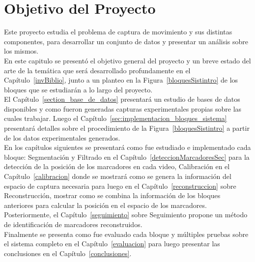 \section{Objetivo del Proyecto}

Este proyecto estudia el problema de captura de movimiento y sus distintas componentes, para desarrollar un conjunto de datos y presentar un análisis sobre los mismos. 
\\

En este capitulo se presentó el objetivo general del proyecto y un breve estado del arte de la temática que será desarrollado profundamente en el Capítulo~\ref{invBiblio}, junto a un planteo en la Figura~\ref{bloquesSistintro} de los bloques que se estudiarán a lo largo del proyecto. 
\\

El Capítulo~\ref{section_base_de_datos} presentará un estudio de bases de datos disponibles y como fueron generadas capturas experimentales propias sobre las cuales trabajar. Luego el Capítulo~\ref{sec:implementacion_bloques_sistema} presentará detalles sobre el procedimiento de la Figura~\ref{bloquesSistintro} a partir de los datos experimentales generados. 
\\

En los capítulos siguientes se presentará como fue estudiado e implementado cada bloque: Segmentación y Filtrado en el Capítulo~\ref{deteccionMarcadoresSec} para la detección de la posición de los marcadores en cada video, Calibración en el Capítulo~\ref{calibracion} donde se mostrará como se genera la información del espacio de captura necesaria para luego en el Capítulo~\ref{reconstruccion} sobre Reconstrucción, mostrar como se combina la información de los bloques anteriores para calcular la posición en el espacio de los marcadores. 
\\

Posteriormente, el Capítulo~\ref{seguimiento} sobre Seguimiento propone un método de identificación de marcadores reconstruidos. 
\\

Finalmente se presenta como fue evaluado cada bloque y múltiples pruebas sobre el sistema completo en el Capítulo~\ref{evaluacion} para luego presentar las conclusiones en el Capítulo~\ref{conclusiones}.


 
  


